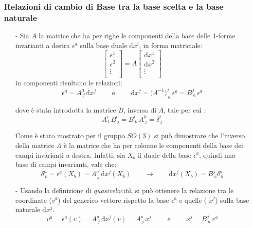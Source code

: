 \documentclass[11pt]{report}
\theoremstyle{plain}
\theoremstyle{definition}
\theoremstyle{remark}
\begin{document}
\subsubsection{Relazioni di cambio di Base tra la base scelta e la base naturale}
\begin{itemize}
\item[-] Sia $A$ la matrice che ha per righe le componenti della base delle 1-forme invarianti a destra $ \epsilon^{a}$  sulla base duale $ \textrm{d}x^{i}$, in forma matriciale:
\begin{displaymath}
\left[ \begin{array}{c} \epsilon ^{1} \\ \epsilon ^{2} \\ \vdots \\ \end{array} \right]
 = A \left[ \begin{array}{c} \textrm{d} x^{1} \\ \textrm{d} x^{2} \\ \vdots \\ \end{array} \right]
\end{displaymath} 
in componenti risultano le relazioni:
\begin{equation}\label{eq:cambiodibase1forme}
\epsilon^{a} = A^{a}_{\: j} \, \textrm{d}x^{j} \qquad \textrm{ e } \qquad \textrm{d} x^{j} = \bigr( A^{-1}\bigr)^{j}_{\: a}\,  \epsilon^{a} = B^{j}_{\: a}\, \epsilon^{a}
\end{equation}

dove è stata introdotta la matrice $B$, inversa di $A$, tale per cui :
\begin{displaymath}
A^{i}_{\: l}\, B^{l}_{\: j} = B^{i}_{\: k} \, A^{k}_{\: j} = \delta^{i}_{\: j}
\end{displaymath}

Come è stato mostrato per il gruppo $SO(3)$ si può dimostrare che l'inverso della matrice $A$ è la matrice che ha per colonne le componenti della base dei campi invarianti a destra. Infatti, sia $X_{b}$ il duale della base $\epsilon^{a}$, quindi una base di campi invarianti, vale che:
\begin{displaymath}
\delta^{a}_{\: b} = \epsilon^{a}(X_{b}) = A^{a}_{\: j}\, \textrm{d}x^{j} (X_{b}) \qquad \rightarrow \qquad \textrm{d}x^{j} (X_{b}) = B^{j}_{\:a}\delta^{a}_{\: b}
\end{displaymath}


\item[-]
Usando la definizione di \emph{quasivelocità}, si può ottenere la relazione tra le coordinate ($v^{a}$) del generico vettore rispetto la base $\epsilon^{a}$ e quelle ( $\dot{x}^{j}$) sulla base naturale $\textrm{d} x^{j}$.
\begin{equation}\label{eq:cambiodibasequasivelocita}
v^{a} = \epsilon^{a}(v) = A^{a}_{\:j}\, \textrm{d}x^{j}(v) = A^{a}_{\:j} \, \dot{x}^{j} \qquad \textrm{ e } \qquad \dot{x}^{j} = B^{j}_{\: a}\, v^{a}
\end{equation}


\end{itemize}
\end{document}
